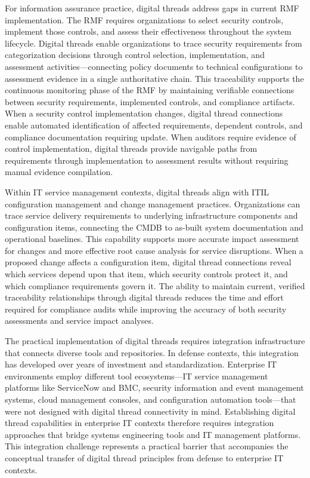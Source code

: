 For information assurance practice, digital threads address gaps in current RMF implementation. The RMF requires organizations to select security controls, implement those controls, and assess their effectiveness throughout the system lifecycle. Digital threads enable organizations to trace security requirements from categorization decisions through control selection, implementation, and assessment activities---connecting policy documents to technical configurations to assessment evidence in a single authoritative chain. This traceability supports the continuous monitoring phase of the RMF by maintaining verifiable connections between security requirements, implemented controls, and compliance artifacts. When a security control implementation changes, digital thread connections enable automated identification of affected requirements, dependent controls, and compliance documentation requiring update. When auditors require evidence of control implementation, digital threads provide navigable paths from requirements through implementation to assessment results without requiring manual evidence compilation.

Within IT service management contexts, digital threads align with ITIL configuration management and change management practices. Organizations can trace service delivery requirements to underlying infrastructure components and configuration items, connecting the CMDB to as-built system documentation and operational baselines. This capability supports more accurate impact assessment for changes and more effective root cause analysis for service disruptions. When a proposed change affects a configuration item, digital thread connections reveal which services depend upon that item, which security controls protect it, and which compliance requirements govern it. The ability to maintain current, verified traceability relationships through digital threads reduces the time and effort required for compliance audits while improving the accuracy of both security assessments and service impact analyses.

The practical implementation of digital threads requires integration infrastructure that connects diverse tools and repositories. In defense contexts, this integration has developed over years of investment and standardization. Enterprise IT environments employ different tool ecosystems---IT service management platforms like ServiceNow and BMC, security information and event management systems, cloud management consoles, and configuration automation tools---that were not designed with digital thread connectivity in mind. Establishing digital thread capabilities in enterprise IT contexts therefore requires integration approaches that bridge systems engineering tools and IT management platforms. This integration challenge represents a practical barrier that accompanies the conceptual transfer of digital thread principles from defense to enterprise IT contexts.

